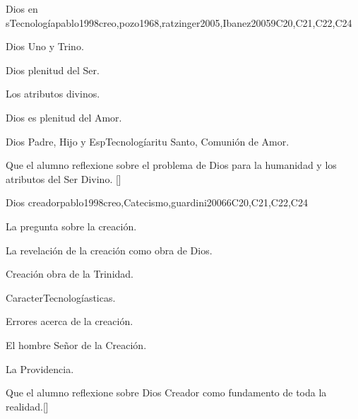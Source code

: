 \begin{syllabus}
\begin{unit}{}{Dios en sTecnología}{pablo1998creo,pozo1968,ratzinger2005,Ibanez2005}{9}{C20,C21,C22,C24}
\begin{topics}
	\item Dios Uno y Trino.
	    \begin{subtopics}
		\item Dios plenitud del Ser.
		\item Los atributos divinos.
		\item Dios es plenitud del Amor.
		\item Dios Padre, Hijo y EspTecnologíaritu Santo, Comunión de Amor.
	    \end{subtopics}
\end{topics}
\begin{learningoutcomes}
	\item Que el  alumno reflexione sobre el problema de Dios para la humanidad y los atributos del Ser Divino. [\Familiarity]
\end{learningoutcomes}
\end{unit}

\begin{unit}{}{Dios creador}{pablo1998creo,Catecismo,guardini2006}{6}{C20,C21,C22,C24}
\begin{topics}
	\item La pregunta sobre la creación.
	      \begin{subtopics}
		\item La revelación de la creación como obra de Dios.
		\item Creación obra de la Trinidad.
		\item CaracterTecnologíasticas.
		\item Errores acerca de la creación.
		\item El hombre Señor de la Creación.
		\item La Providencia.
	      \end{subtopics}
\end{topics}
\begin{learningoutcomes}
	\item Que el  alumno reflexione sobre Dios Creador como fundamento de toda la realidad.[\Familiarity]
\end{learningoutcomes}
\end{unit}


\end{syllabus}
